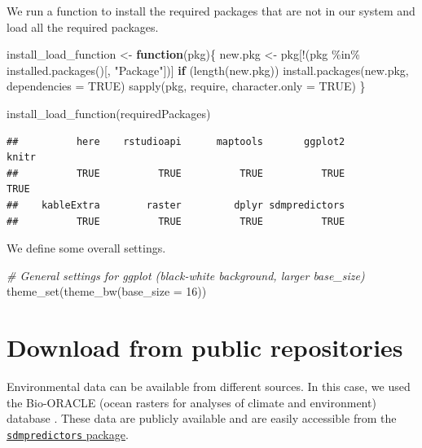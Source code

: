 \documentclass[
]{book}
\newenvironment{Shaded}{\begin{snugshade}}{\end{snugshade}}
\newcommand{\AttributeTok}[1]{\textcolor[rgb]{0.77,0.63,0.00}{#1}}
\newcommand{\CommentTok}[1]{\textcolor[rgb]{0.56,0.35,0.01}{\textit{#1}}}
\newcommand{\ConstantTok}[1]{\textcolor[rgb]{0.00,0.00,0.00}{#1}}
\newcommand{\ControlFlowTok}[1]{\textcolor[rgb]{0.13,0.29,0.53}{\textbf{#1}}}
\newcommand{\DecValTok}[1]{\textcolor[rgb]{0.00,0.00,0.81}{#1}}
\newcommand{\FunctionTok}[1]{\textcolor[rgb]{0.00,0.00,0.00}{#1}}
\newcommand{\NormalTok}[1]{#1}
\newcommand{\OtherTok}[1]{\textcolor[rgb]{0.56,0.35,0.01}{#1}}
\newcommand{\SpecialCharTok}[1]{\textcolor[rgb]{0.00,0.00,0.00}{#1}}
\newcommand{\StringTok}[1]{\textcolor[rgb]{0.31,0.60,0.02}{#1}}
\begin{document}
We run a function to install the required packages that are not in our system and load all the required packages.

\begin{Shaded}
\begin{Highlighting}[]
\NormalTok{install\_load\_function }\OtherTok{\textless{}{-}} \ControlFlowTok{function}\NormalTok{(pkg)\{}
\NormalTok{  new.pkg }\OtherTok{\textless{}{-}}\NormalTok{ pkg[}\SpecialCharTok{!}\NormalTok{(pkg }\SpecialCharTok{\%in\%} \FunctionTok{installed.packages}\NormalTok{()[, }\StringTok{"Package"}\NormalTok{])]}
  \ControlFlowTok{if}\NormalTok{ (}\FunctionTok{length}\NormalTok{(new.pkg))}
    \FunctionTok{install.packages}\NormalTok{(new.pkg, }\AttributeTok{dependencies =} \ConstantTok{TRUE}\NormalTok{)}
  \FunctionTok{sapply}\NormalTok{(pkg, require, }\AttributeTok{character.only =} \ConstantTok{TRUE}\NormalTok{)}
\NormalTok{\}}

\FunctionTok{install\_load\_function}\NormalTok{(requiredPackages)}
\end{Highlighting}
\end{Shaded}

\begin{verbatim}
##          here    rstudioapi      maptools       ggplot2         knitr 
##          TRUE          TRUE          TRUE          TRUE          TRUE 
##    kableExtra        raster         dplyr sdmpredictors 
##          TRUE          TRUE          TRUE          TRUE
\end{verbatim}

We define some overall settings.

\begin{Shaded}
\begin{Highlighting}[]
\CommentTok{\# General settings for ggplot (black{-}white background, larger base\_size)}
\FunctionTok{theme\_set}\NormalTok{(}\FunctionTok{theme\_bw}\NormalTok{(}\AttributeTok{base\_size =} \DecValTok{16}\NormalTok{))}
\end{Highlighting}
\end{Shaded}

\hypertarget{download-from-public-repositories}{%
\section{Download from public repositories}\label{download-from-public-repositories}}

Environmental data can be available from different sources. In this case, we used the Bio-ORACLE (ocean
rasters for analyses of climate and environment) database \citep{tyberghein_etal_2012, assis_etal_2017}. These data are publicly available and are easily accessible from the \href{https://cran.r-project.org/web/packages/sdmpredictors/index.html}{\texttt{sdmpredictors} package}.
\end{document}
